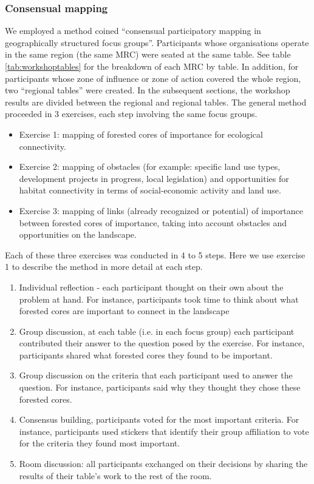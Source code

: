 \subsubsection{Consensual mapping}

We employed a method coined “consensual participatory mapping in geographically structured focus groups”. Participants whose organisations operate in the same region (the same MRC) were seated at the same table. See table \ref{tab:workshoptables} for the breakdown of each MRC by table. In addition, for participants whose zone of influence or zone of action covered the whole region, two “regional tables” were created. In the subsequent sections, the workshop results are divided between the regional and regional tables.
The general method proceeded in 3 exercises, each step involving the same focus groups.

\begin{itemize}
  \item Exercise 1: mapping of forested cores of importance for ecological connectivity.
  \item Exercise 2: mapping of obstacles (for example: specific land use types, development projects in progress, local legislation) and opportunities for habitat connectivity in terms of social-economic activity and land use.
  \item Exercise 3: mapping of links (already recognized or potential) of importance between forested cores of importance, taking into account obstacles and opportunities on the landscape.
\end{itemize}

Each of these three exercises was conducted in 4 to 5 steps. Here we use exercise 1 to describe the method in more detail at each step.

\begin{enumerate}
\item Individual reflection - each participant thought on their own about the problem at hand. For instance, participants took time to think about what forested cores are important to connect in the landscape
\item Group discussion, at each table (i.e. in each focus group) each participant contributed their answer to the question posed by the exercise. For instance, participants shared what forested cores they found to be important.
\item Group discussion on the criteria that each participant used to answer the question. For instance, participants said why they thought they chose these forested cores.
\item Consensus building, participants voted for the most important criteria. For instance, participants used stickers that identify their group affiliation to vote for the criteria they found most important.
\item Room discussion: all participants exchanged on their decisions by sharing the results of their table’s work to the rest of the room.
\end{enumerate}

